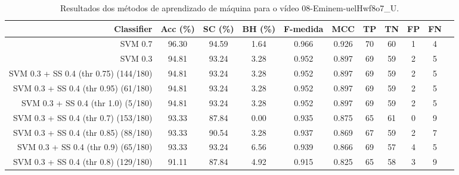\begin{table}[!htb]
\centering
\caption{Resultados dos métodos de aprendizado de máquina para o vídeo 08-Eminem-uelHwf8o7_U.}
\label{tab:08-Eminem-uelHwf8o7_U}
\begin{tabular}{r|c|c|c|c|c|c|c|c|c|c}
\hline\hline
Classifier & Acc (\%) & SC (\%) & BH (\%) & F-medida & MCC & TP & TN & FP & FN \\ \hline
SVM 0.7 & 96.30 & 94.59 & 1.64 & 0.966 & 0.926 & 70 & 60 & 1 & 4 \\ 
SVM 0.3 & 94.81 & 93.24 & 3.28 & 0.952 & 0.897 & 69 & 59 & 2 & 5 \\ 
SVM 0.3 + SS 0.4 (thr 0.75) (144/180) & 94.81 & 93.24 & 3.28 & 0.952 & 0.897 & 69 & 59 & 2 & 5 \\ 
SVM 0.3 + SS 0.4 (thr 0.95) (61/180) & 94.81 & 93.24 & 3.28 & 0.952 & 0.897 & 69 & 59 & 2 & 5 \\ 
SVM 0.3 + SS 0.4 (thr 1.0) (5/180) & 94.81 & 93.24 & 3.28 & 0.952 & 0.897 & 69 & 59 & 2 & 5 \\ 
SVM 0.3 + SS 0.4 (thr 0.7) (153/180) & 93.33 & 87.84 & 0.00 & 0.935 & 0.875 & 65 & 61 & 0 & 9 \\ 
SVM 0.3 + SS 0.4 (thr 0.85) (88/180) & 93.33 & 90.54 & 3.28 & 0.937 & 0.869 & 67 & 59 & 2 & 7 \\ 
SVM 0.3 + SS 0.4 (thr 0.9) (65/180) & 93.33 & 93.24 & 6.56 & 0.939 & 0.866 & 69 & 57 & 4 & 5 \\ 
SVM 0.3 + SS 0.4 (thr 0.8) (129/180) & 91.11 & 87.84 & 4.92 & 0.915 & 0.825 & 65 & 58 & 3 & 9 \\ 
\hline\hline
\end{tabular}
\end{table}

